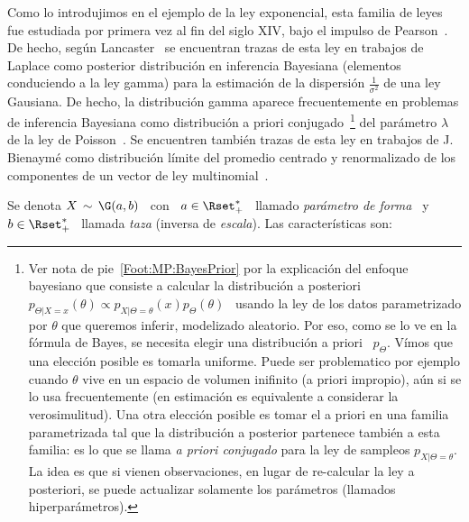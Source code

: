 \label{Sssec:MP:Gamma}

Como lo introdujimos en el ejemplo  de la ley exponencial, esta familia de leyes
fue  estudiada  por primera  vez  al  fin del  siglo  XIV,  bajo  el impulso  de
Pearson~\cite{Pea95}.   De hecho,  seg\'un Lancaster~\cite{Lan66}  se encuentran
trazas  de esta  ley en  trabajos de  Laplace como  posterior  distribuci\'on en
inferencia Bayesiana (elementos conduciendo a la ley gamma) para la estimaci\'on
de  la  dispersi\'on $\frac1{\sigma^2}$  de  una  ley  Gausiana.  De  hecho,  la
distribuci\'on gamma aparece frecuentemente en problemas de inferencia Bayesiana
como    distribuci\'on     a    priori    conjugado~\footnote{Ver     nota    de
  pie~\ref{Foot:MP:BayesPrior}  por  la   explicaci\'on  del  enfoque  bayesiano  que
  consiste  a calcular  la distribuci\'on  a  posteriori $p_{\Theta|X=x}(\theta)
  \propto p_{X|\Theta=\theta}(x) p_\Theta(\theta)$ \  usando la ley de los datos
  parametrizado  por $\theta$  que queremos  inferir, modelizado  aleatorio. Por
  eso,  como  se  lo ve  en  la  f\'ormula  de  Bayes,  se necesita  elegir  una
  distribuci\'on a priori  \ $p_\Theta$.  V\'imos que una  elecci\'on posible es
  tomarla uniforme. Puede  ser problematico por ejemplo cuando  $\theta$ vive en
  un  espacio de  volumen inifinito  (a  priori impropio),  a\'un si  se lo  usa
  frecuentemente (en estimaci\'on es equivalente a considerar la verosimulitud).
  Una otra elecci\'on posible es tomar  el a priori en una familia parametrizada
  tal que la  distribuci\'on a posterior partenece tambi\'en  a esta familia: es
  lo que se llama {\em a  priori conjugado} para la ley de sampleos $p_{X|\Theta
    = \theta}$. La idea es que  si vienen observaciones, en lugar de re-calcular
  la ley a posteriori, se  puede actualizar solamente los par\'ametros (llamados
  hiperpar\'ametros).\label{Foot:MP:BayesPriorConjugado}}     del    par\'ametro
$\lambda$ de la  ley de Poisson~\cite{Rob07}. Se encuentren  tambi\'en trazas de
esta ley en trabajos de J.  Bienaym\'e como distribuci\'on l\'imite del promedio
centrado   y  renormalizado   de   los   componentes  de   un   vector  de   ley
multinomial~\cite{Bie38, Lan66}.

Se  denota $X \,  \sim \,  \G(a,b)$ \  con \  $a \in  \Rset_+^*$ \  llamado {\em
par\'ametro de  forma} \ y \  $b \in \Rset_+^*$  \ llamada {\em taza}  (inversa de
{\em escala}). Las caracter\'isticas son:

